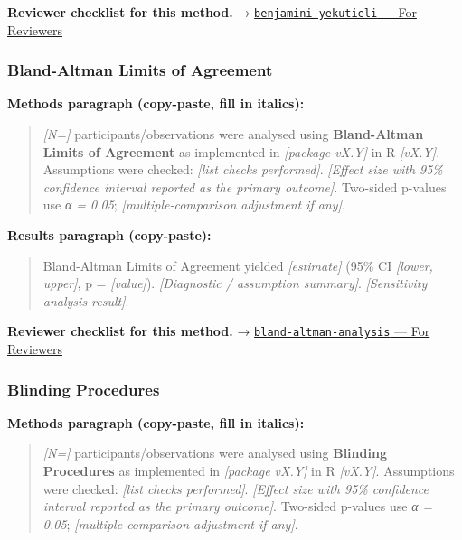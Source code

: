\documentclass[
]{article}
\begin{document}
\textbf{Reviewer checklist for this method.} →
\href{../chapters/04-inferential/benjamini-yekutieli.Rmd\#for-reviewers}{\texttt{benjamini-yekutieli}
--- For Reviewers}

\subsubsection{Bland-Altman Limits of
Agreement}\label{bland-altman-limits-of-agreement}

\textbf{Methods paragraph (copy-paste, fill in italics):}

\begin{quote}
\emph{{[}N={]}} participants/observations were analysed using
\textbf{Bland-Altman Limits of Agreement} as implemented in
\emph{{[}package vX.Y{]}} in R \emph{{[}vX.Y{]}}. Assumptions were
checked: \emph{{[}list checks performed{]}}. \emph{{[}Effect size with
95\% confidence interval reported as the primary outcome{]}}. Two-sided
p-values use \emph{α = 0.05}; \emph{{[}multiple-comparison adjustment if
any{]}}.
\end{quote}

\textbf{Results paragraph (copy-paste):}

\begin{quote}
Bland-Altman Limits of Agreement yielded \emph{{[}estimate{]}} (95\% CI
\emph{{[}lower, upper{]}}, p = \emph{{[}value{]}}). \emph{{[}Diagnostic
/ assumption summary{]}}. \emph{{[}Sensitivity analysis result{]}}.
\end{quote}

\textbf{Reviewer checklist for this method.} →
\href{../chapters/14-clinical/bland-altman-analysis.Rmd\#for-reviewers}{\texttt{bland-altman-analysis}
--- For Reviewers}

\subsubsection{Blinding Procedures}\label{blinding-procedures}

\textbf{Methods paragraph (copy-paste, fill in italics):}

\begin{quote}
\emph{{[}N={]}} participants/observations were analysed using
\textbf{Blinding Procedures} as implemented in \emph{{[}package vX.Y{]}}
in R \emph{{[}vX.Y{]}}. Assumptions were checked: \emph{{[}list checks
performed{]}}. \emph{{[}Effect size with 95\% confidence interval
reported as the primary outcome{]}}. Two-sided p-values use \emph{α =
0.05}; \emph{{[}multiple-comparison adjustment if any{]}}.
\end{quote}
\end{document}
